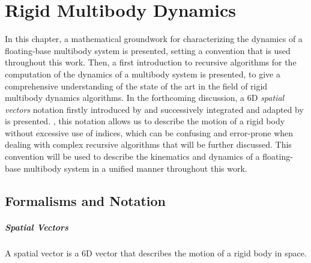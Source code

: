 \chapter{Rigid Multibody Dynamics}
\label{chp:back_RBDynamics}

In this chapter, a mathematical groundwork for characterizing the dynamics of a floating-base multibody system is presented, setting a convention that is used throughout this work. Then, a first introduction to recursive algorithms for the computation of the dynamics of a multibody system is presented, to give a comprehensive understanding of the state of the art in the field of rigid multibody dynamics algorithms. In the forthcoming discussion, a 6D \textit{spatial vectors} notation firstly introduced by \citet{featherstone_rigid_2008} and successively integrated and adapted by \citet{traversaro_multibody_2019}  is presented. , this notation allows us to describe the motion of a rigid body without excessive use of indices, which can be confusing and error-prone when dealing with complex recursive algorithms that will be further discussed. This convention will be used to describe the kinematics and dynamics of a floating-base multibody system in a unified manner throughout this work.

\section{Formalisms and Notation}

\paragraph{Spatial Vectors} A spatial vector is a 6D vector that describes the motion of a rigid body in space.

